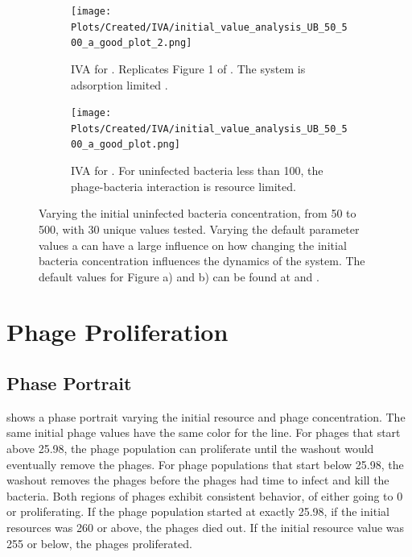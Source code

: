 \begin{figure}
    \centering
    \begin{subfigure}{1\linewidth}
        \centering
        \texttt{[image: Plots/Created/IVA/initial\_value\_analysis\_UB\_50\_500\_a\_good\_plot\_2.png]}
        \caption{
            IVA for . 
            Replicates Figure 1 of \citet{mullaExtremeDiversityPhage2024}. 
            The system is adsorption limited \cite{mullaExtremeDiversityPhage2024}. 
        }
        \label{fig:created:initial_value_analysis_UB_50_500_a_good_plot_2}
    \end{subfigure}
    \hfill
    \begin{subfigure}{1\linewidth}
        \centering
        \texttt{[image: Plots/Created/IVA/initial\_value\_analysis\_UB\_50\_500\_a\_good\_plot.png]}
        \caption{
            IVA for . 
            For uninfected bacteria less than 100, the phage-bacteria interaction is resource limited. 
        }
        \label{fig:created:initial_value_analysis_UB_50_500_a_good_plot}
    \end{subfigure}
    \caption{
        Varying the initial uninfected bacteria concentration, from 50 to 500, with 30 unique values tested. 
        Varying the default parameter values a can have a large influence on how changing the initial bacteria concentration influences the dynamics of the system. 
        The default values for Figure a) and b) can be found at  and . 
    }
\end{figure}

\section{Phage Proliferation}
\label{sec:results:phase_portrait}
\subsection{Phase Portrait}
 shows a phase portrait varying the initial resource and phage concentration. 
The same initial phage values have the same color for the line. 
For phages that start above 25.98, the phage population can proliferate until the washout would eventually remove the phages. 
For phage populations that start below 25.98, the washout removes the phages before the phages had time to infect and kill the bacteria. 
Both regions of phages exhibit consistent behavior, of either going to 0 or proliferating. 
If the phage population started at exactly 25.98, if the initial resources was 260 or above, the phages died out. 
If the initial resource value was 255 or below, the phages proliferated. 

